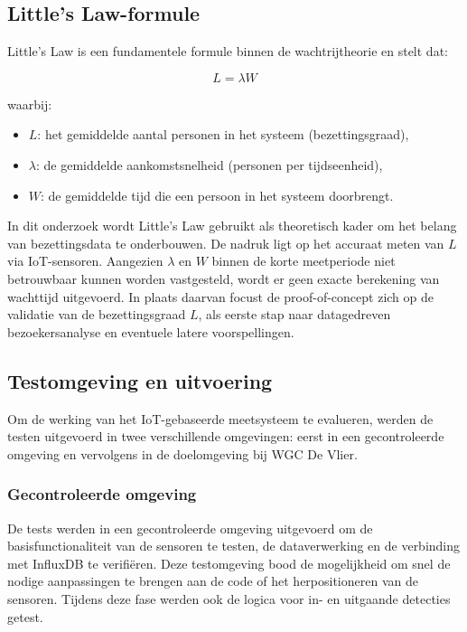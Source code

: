 \subsection{Little's Law-formule}

Little’s Law is een fundamentele formule binnen de wachtrijtheorie en stelt dat:

\[
L = \lambda W
\]

waarbij:
\begin{itemize}
    \item \( L \): het gemiddelde aantal personen in het systeem (bezettingsgraad),
    \item \( \lambda \): de gemiddelde aankomstsnelheid (personen per tijdseenheid),
    \item \( W \): de gemiddelde tijd die een persoon in het systeem doorbrengt.
\end{itemize}

In dit onderzoek wordt Little’s Law gebruikt als theoretisch kader om het belang van bezettingsdata te onderbouwen. De nadruk ligt op het accuraat meten van \( L \) via IoT-sensoren. Aangezien \( \lambda \) en \( W \) binnen de korte meetperiode niet betrouwbaar kunnen worden vastgesteld, wordt er geen exacte berekening van wachttijd uitgevoerd. In plaats daarvan focust de proof-of-concept zich op de validatie van de bezettingsgraad \( L \), als eerste stap naar datagedreven bezoekersanalyse en eventuele latere voorspellingen.

\subsection{Testomgeving en uitvoering}
Om de werking van het IoT-gebaseerde meetsysteem te evalueren, werden de testen uitgevoerd in twee verschillende omgevingen: eerst in een gecontroleerde omgeving en vervolgens in de doelomgeving bij WGC De Vlier.

\subsubsection{Gecontroleerde omgeving}
De tests werden in een gecontroleerde omgeving uitgevoerd om de basisfunctionaliteit van de sensoren te testen, de dataverwerking en de verbinding met InfluxDB te verifiëren. Deze testomgeving bood de mogelijkheid om snel de nodige aanpassingen te brengen aan de code of het herpositioneren van de sensoren. Tijdens deze fase werden ook de logica voor in- en uitgaande detecties getest.

